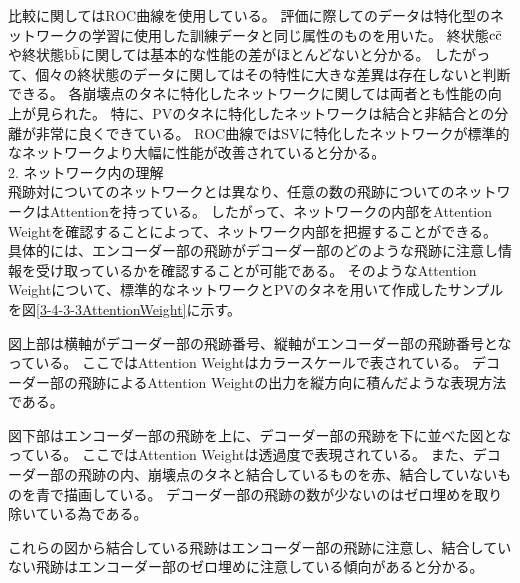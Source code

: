 比較に関してはROC曲線を使用している。
評価に際してのデータは特化型のネットワークの学習に使用した訓練データと同じ属性のものを用いた。
終状態$\rm c\bar{c}$や終状態$\rm b\bar{b}$に関しては基本的な性能の差がほとんどないと分かる。
したがって、個々の終状態のデータに関してはその特性に大きな差異は存在しないと判断できる。
各崩壊点のタネに特化したネットワークに関しては両者とも性能の向上が見られた。
特に、PVのタネに特化したネットワークは結合と非結合との分離が非常に良くできている。
ROC曲線ではSVに特化したネットワークが標準的なネットワークより大幅に性能が改善されていると分かる。\\

2. ネットワーク内の理解\\

飛跡対についてのネットワークとは異なり、任意の数の飛跡についてのネットワークはAttentionを持っている。
したがって、ネットワークの内部をAttention Weightを確認することによって、ネットワーク内部を把握することができる。
具体的には、エンコーダー部の飛跡がデコーダー部のどのような飛跡に注意し情報を受け取っているかを確認することが可能である。
そのようなAttention Weightについて、標準的なネットワークとPVのタネを用いて作成したサンプルを図\ref{3-4-3-3AttentionWeight}に示す。

図上部は横軸がデコーダー部の飛跡番号、縦軸がエンコーダー部の飛跡番号となっている。
ここではAttention Weightはカラースケールで表されている。
デコーダー部の飛跡によるAttention Weightの出力を縦方向に積んだような表現方法である。

図下部はエンコーダー部の飛跡を上に、デコーダー部の飛跡を下に並べた図となっている。
ここではAttention Weightは透過度で表現されている。
また、デコーダー部の飛跡の内、崩壊点のタネと結合しているものを赤、結合していないものを青で描画している。
デコーダー部の飛跡の数が少ないのはゼロ埋めを取り除いている為である。

これらの図から結合している飛跡はエンコーダー部の飛跡に注意し、結合していない飛跡はエンコーダー部のゼロ埋めに注意している傾向があると分かる。

